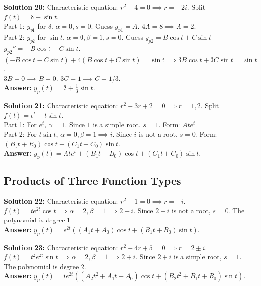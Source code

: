 \documentclass[11pt]{article}
\begin{document}
\textbf{Solution 20:} 
Characteristic equation: $r^2 + 4 = 0 \implies r = \pm 2i$. 
Split $f(t) = 8 + \sin t$. \\
Part 1: $y_{p1}$ for $8$. $\alpha=0, s=0$. Guess $y_{p1} = A$. $4A = 8 \implies A = 2$. \\
Part 2: $y_{p2}$ for $\sin t$. $\alpha=0, \beta=1, s=0$. Guess $y_{p2} = B\cos t + C\sin t$. \\
$y_{p2}'' = -B\cos t - C\sin t$. \\
$(-B\cos t - C\sin t) + 4(B\cos t + C\sin t) = \sin t \implies 3B\cos t + 3C\sin t = \sin t$. \\
$3B = 0 \implies B = 0$. $3C = 1 \implies C = 1/3$. \\
\textbf{Answer:} $y_p(t) = 2 + \frac{1}{3}\sin t$.

\textbf{Solution 21:} 
Characteristic equation: $r^2 - 3r + 2 = 0 \implies r = 1, 2$. 
Split $f(t) = e^t + t\sin t$. \\
Part 1: For $e^t$, $\alpha=1$. Since $1$ is a simple root, $s=1$. Form: $A t e^t$. \\
Part 2: For $t\sin t$, $\alpha=0, \beta=1 \implies i$. Since $i$ is not a root, $s=0$. Form: $(B_1t + B_0)\cos t + (C_1t + C_0)\sin t$. \\
\textbf{Answer:} $y_p(t) = A t e^t + (B_1t + B_0)\cos t + (C_1t + C_0)\sin t$.

\subsection*{Products of Three Function Types}

\textbf{Solution 22:} 
Characteristic equation: $r^2 + 1 = 0 \implies r = \pm i$. 
$f(t) = t e^{2t} \cos t \implies \alpha=2, \beta=1 \implies 2+i$. Since $2+i$ is not a root, $s=0$. The polynomial is degree 1. \\
\textbf{Answer:} $y_p(t) = e^{2t} \left( (A_1t + A_0)\cos t + (B_1t + B_0)\sin t \right)$.

\textbf{Solution 23:} 
Characteristic equation: $r^2 - 4r + 5 = 0 \implies r = 2 \pm i$. 
$f(t) = t^2 e^{2t} \sin t \implies \alpha=2, \beta=1 \implies 2+i$. Since $2+i$ is a simple root, $s=1$. The polynomial is degree 2. \\
\textbf{Answer:} $y_p(t) = t e^{2t} \left( (A_2t^2 + A_1t + A_0)\cos t + (B_2t^2 + B_1t + B_0)\sin t \right)$.
\end{document}

